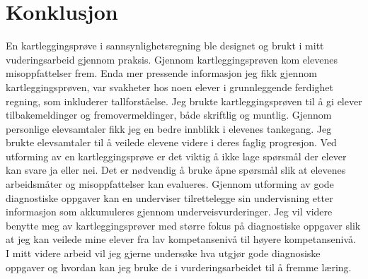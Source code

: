 \documentclass[main.tex]{subfiles}
\begin{document}
\section*{Konklusjon}
\label{sec:6}
En kartleggingsprøve i sannsynlighetsregning ble designet og brukt i mitt vuderingsarbeid
gjennom praksis. Gjennom kartleggingsprøven kom elevenes misoppfattelser frem. Enda mer pressende 
informasjon jeg fikk gjennom kartleggingsprøven, var svakheter hos noen elever i grunnleggende 
ferdighet regning, som inkluderer tallforståelse. Jeg brukte kartleggingsprøven til å gi elever tilbakemeldinger 
og fremovermeldinger, både skriftlig og muntlig. Gjennom personlige elevsamtaler fikk jeg en bedre 
innblikk i elevenes tankegang. Jeg brukte elevsamtaler til å veilede elevene videre i deres faglig progresjon. 
Ved utforming av en kartleggingsprøve er det viktig å ikke lage spørsmål der elever kan svare ja eller nei. 
Det er nødvendig å bruke åpne spørsmål slik at elevenes arbeidsmåter og misoppfattelser kan evalueres. 
Gjennom utforming av gode diagnostiske oppgaver kan en underviser tilrettelegge sin undervisning etter 
informasjon som akkumuleres gjennom underveisvurderinger. Jeg vil videre benytte meg av kartleggingsprøver 
med større fokus på diagnostiske oppgaver slik at jeg kan veilede mine elever fra lav 
kompetansenivå til høyere kompetansenivå. I mitt videre arbeid vil jeg gjerne undersøke hva 
utgjør gode diagnosiske oppgaver og hvordan kan jeg bruke de i vurderingsarbeidet til å fremme 
læring.
\end{document}
